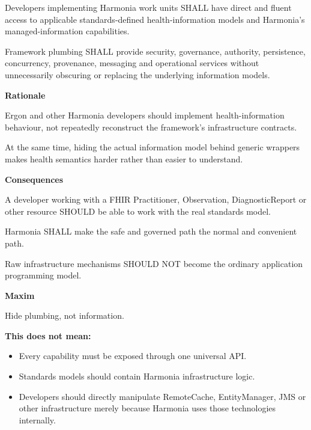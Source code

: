 Developers implementing Harmonia work units SHALL have direct and fluent
access to applicable standards-defined health-information models and
Harmonia's managed-information capabilities.



Framework plumbing SHALL provide security, governance, authority,
persistence, concurrency, provenance, messaging and operational services
without unnecessarily obscuring or replacing the underlying information
models.



\par\medskip\textbf{Rationale}\par


Ergon and other Harmonia developers should
implement health-information behaviour, not repeatedly reconstruct the
framework's infrastructure contracts.



At the same time, hiding the actual information model behind generic
wrappers makes health semantics harder rather than easier to understand.



\par\medskip\textbf{Consequences}\par


A developer working with a FHIR Practitioner, Observation,
DiagnosticReport or other resource SHOULD be able to work with the real
standards model.



Harmonia SHALL make the safe and governed path the normal and convenient
path.



Raw infrastructure mechanisms SHOULD NOT become the ordinary application
programming model.



\par\medskip\textbf{Maxim}\par


Hide plumbing, not information.



\textbf{This does not mean:}



\begin{itemize}


\item Every capability must be exposed through one universal API.

\item Standards models should contain Harmonia infrastructure logic.

\item Developers should directly manipulate RemoteCache, EntityManager, JMS or other infrastructure merely because Harmonia uses those technologies internally.

\end{itemize}

